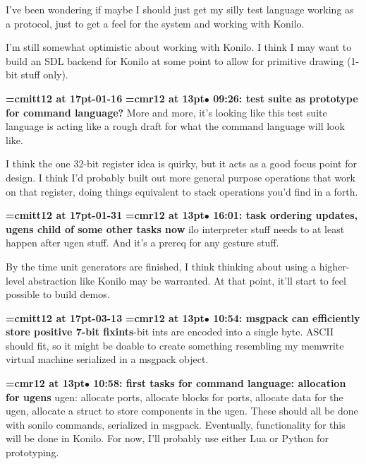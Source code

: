 I've been wondering if maybe I should just get my silly test language working as a protocol, just to get a feel for the system and working with Konilo.
\par

I'm still somewhat optimistic about working with Konilo. I think I may want to build an SDL backend for Konilo at some point to allow for primitive drawing (1-bit stuff only).
\par

{\medskip\noindent\bf\font\titlefont=cmitt12 at 17pt-01-16}\medskip
{\smallskip\noindent\bf\font\titlefont=cmr12 at 13pt\titlefont $\bullet$ 09:26: test suite as prototype for command language?}\smallskip
More and more, it's looking like this test suite language is acting like a rough draft for what the command language will look like.
\par

I think the one 32-bit register idea is quirky, but it acts as a good focus point for design. I think I'd probably built out more general purpose operations that work on that register, doing things equivalent to stack operations you'd find in a forth.
\par

{\medskip\noindent\bf\font\titlefont=cmitt12 at 17pt-01-31}\medskip
{\smallskip\noindent\bf\font\titlefont=cmr12 at 13pt\titlefont $\bullet$ 16:01: task ordering updates, ugens child of some other tasks now}\smallskip
ilo interpreter stuff needs to at least happen after ugen stuff. And it's a prereq for any gesture stuff.
\par

By the time unit generators are finished, I think thinking about using a higher-level abstraction like Konilo may be warranted. At that point, it'll start to feel possible to build demos.
\par

{\medskip\noindent\bf\font\titlefont=cmitt12 at 17pt-03-13}\medskip
{\smallskip\noindent\bf\font\titlefont=cmr12 at 13pt\titlefont $\bullet$ 10:54: msgpack can efficiently store positive 7-bit fixints}-bit ints are encoded into a single byte. ASCII should fit, so it might be doable to create something resembling my memwrite virtual machine serialized in a msgpack object.
\par

{\smallskip\noindent\bf\font\titlefont=cmr12 at 13pt\titlefont $\bullet$ 10:58: first tasks for command language: allocation for ugens}\smallskip
ugen: allocate ports, allocate blocks for ports, allocate data for the ugen, allocate a struct to store components in the ugen. These should all be done with sonilo commands, serialized in msgpack. Eventually, functionality for this will be done in Konilo. For now, I'll probably use either Lua or Python for prototyping.
\par

